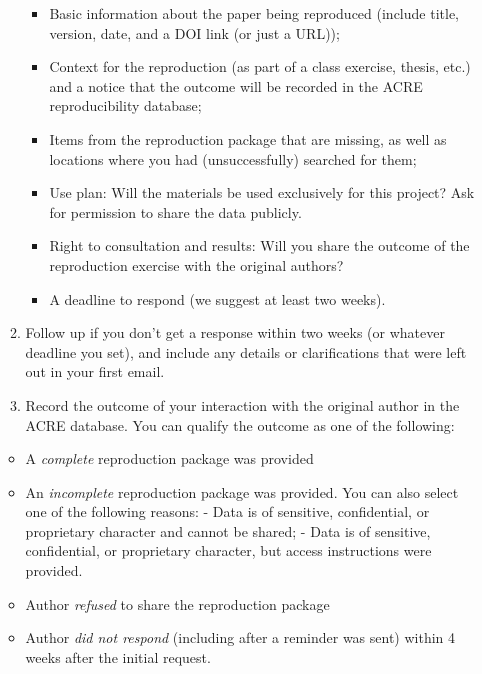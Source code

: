 \documentclass[]{book}
\providecommand{\tightlist}{%
  \setlength{\itemsep}{0pt}\setlength{\parskip}{0pt}}
\begin{document}
\begin{enumerate}
\begin{enumerate}
    \begin{itemize}
    \tightlist
    \item
      Basic information about the paper being reproduced (include title, version, date, and a DOI link (or just a URL));\\
    \item
      Context for the reproduction (as part of a class exercise, thesis, etc.) and a notice that the outcome will be recorded in the ACRE reproducibility database;\\
    \item
      Items from the reproduction package that are missing, as well as locations where you had (unsuccessfully) searched for them;\\
    \item
      Use plan: Will the materials be used exclusively for this project? Ask for permission to share the data publicly.\\
    \item
      Right to consultation and results: Will you share the outcome of the reproduction exercise with the original authors?\\
    \item
      A deadline to respond (we suggest at least two weeks).
    \end{itemize}
  \item
    Follow up if you don't get a response within two weeks (or whatever deadline you set), and include any details or clarifications that were left out in your first email.
  \item
    Record the outcome of your interaction with the original author in the ACRE database. You can qualify the outcome as one of the following:
  \end{enumerate}

  \begin{itemize}
  \tightlist
  \item
    A \emph{complete} reproduction package was provided
  \item
    An \emph{incomplete} reproduction package was provided. You can also select one of the following reasons:
    - Data is of sensitive, confidential, or proprietary character and cannot be shared;
    - Data is of sensitive, confidential, or proprietary character, but access instructions were provided.
  \item
    Author \emph{refused} to share the reproduction package
  \item
    Author \emph{did not respond} (including after a reminder was sent) within 4 weeks after the initial request.
  \end{itemize}
\end{enumerate}
\end{document}
